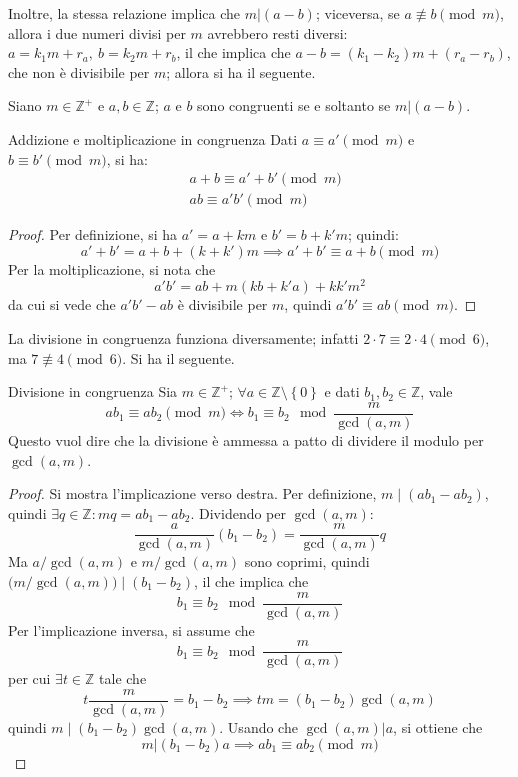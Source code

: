 \documentclass[11pt, a4paper]{scrartcl}
\theoremstyle{definition}
\numberwithin{esempio}{section}
\theoremstyle{definition}
\numberwithin{obs}{section}
\numberwithin{nota}{section}
\numberwithin{equation}{subsection}
\begin{document}
Inoltre, la stessa relazione implica che $m | (a-b)$; viceversa, se $a \not \equiv b \pmod{m} $, allora i due numeri divisi per $m$ avrebbero resti diversi: $a = k_1 m + r_a, \ b = k_2 m + r_b$, il che implica che $a-b = (k_1 - k_2)m + (r_a- r_b)$, che non \`e divisibile per $m$; allora si ha il seguente.
\begin{prop}
	{}{}
	Siano $m \in \mathbb{Z}^+$ e $a,b \in \mathbb{Z}$; $a$ e $b$ sono congruenti se e soltanto se $m | (a-b)$.
\end{prop}
\begin{prop}
	{Addizione e moltiplicazione in congruenza}{}
	Dati $a\equiv a' \pmod{m} $ e $b\equiv b' \pmod{m} $, si ha:
	\[
		\begin{split}
			&a + b \equiv a' + b' \pmod{m}  \\
			& a b\equiv a'b' \pmod{m} 
		\end{split}
	\] 
\begin{proof}
	Per definizione, si ha $a ' = a + km$ e $b' = b + k'm $; quindi:
	\[
	a' + b ' = a+ b + (k+k') m\implies a' + b' \equiv a + b\pmod{m} 
	\] 
	Per la moltiplicazione, si nota che 
	\[
	a' b ' = a b + m(kb + k'a) +kk'm^2
	\] 
	da cui si vede che $a'b' - ab$ \`e divisibile per $m$, quindi $a'b' \equiv ab \pmod{m} $.
\end{proof}	
\end{prop}
La divisione in congruenza funziona diversamente; infatti $2 \cdot  7 \equiv 2 \cdot  4 \pmod{6} $, ma $7 \not \equiv 4 \pmod{6} $. 
Si ha il seguente.
\begin{teorema}
	{Divisione in congruenza}{}
	Sia $m \in \mathbb{Z}^+$; $\forall a \in  \mathbb{Z} \setminus \left\{ 0 \right\} $ e dati $b_1,b_2 \in \mathbb{Z}$, vale
	\[
	ab_1 \equiv ab_2 \pmod{m} \iff b_1 \equiv b_2 \mod{\frac{m}{\operatorname{gcd}(a,m) }} 
	\] 
	Questo vuol dire che la divisione \`e ammessa a patto di dividere il modulo per $\operatorname{gcd}(a,m) $.
	\begin{proof}
		Si mostra l'implicazione verso destra.
		Per definizione, $m  \mid  (ab_1- ab_2)$, quindi $\exists q \in \mathbb{Z} : mq = ab_1 - ab_2$.
		Dividendo per $\operatorname{gcd}(a,m) $:
		\[
		\frac{a}{\operatorname{gcd}(a,m) } (b_1-b_2) = \frac{m}{\operatorname{gcd}(a,m) } q
		\] 
		Ma $a / \operatorname{gcd}(a,m) $ e $m / \operatorname{gcd}(a,m) $ sono coprimi, quindi $\big(m / \operatorname{gcd}(a,m) \big)  \mid (b_1-b_2)$, il che implica che
		\[
		b_1\equiv b_2 \mod \frac{m}{\operatorname{gcd}(a,m) }
		\] 
		Per l'implicazione inversa, si assume che
		\[
		b_1\equiv b_2 \mod \frac{m}{\operatorname{gcd}(a,m) }
		\] 
		per cui $\exists t \in \mathbb{Z}$ tale che 
		\[
		t \frac{m}{\operatorname{gcd}(a,m) } = b_1-b_2 \implies tm  = (b_1-b_2) \operatorname{gcd}(a,m) 
		\] 
		quindi $m  \mid (b_1 -b_2) \operatorname{gcd}(a,m) $. 
		Usando che $\operatorname{gcd}(a,m) | a$, si ottiene che
		\[
		m | (b_1-b_2) a \implies ab_1 \equiv ab_2 \pmod{m} 
		\] 
	\end{proof}
\end{teorema}
\end{document}
